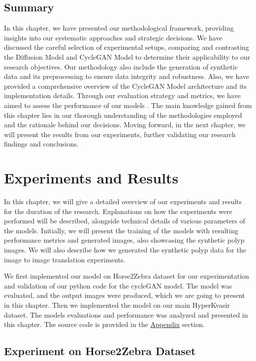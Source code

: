 \documentclass[UKenglish,12pt]{master-style}
\begin{document}
\section{Summary}

In this chapter, we have presented our methodological framework, providing insights into our systematic approaches and strategic decisions. We have discussed the careful selection of experimental setups, comparing and contrasting the Diffusion Model and CycleGAN Model to determine their applicability to our research objectives. Our methodology also include the generation of synthetic data and its preprocessing to ensure data integrity and robustness. Also, we have provided a comprehensive overview of the CycleGAN Model architecture and its implementation details. Through our evaluation strategy and metrics, we have aimed to assess the performance of our models . The main knowledge gained from this chapter lies in our thorough understanding of the methodologies employed and the rationale behind our decisions. Moving forward, in the next chapter, we will present the results from our experiments, further validating our research findings and conclusions. 

\chapter{Experiments and Results}

In this chapter, we will give a detailed overview of our experiments and results for the duration of the research. Explanations on how the experiments were performed will be described, alongside technical details of various parameters of the models. Initially, we will present the training of the models with resulting performance metrics and generated images, also showcasing the synthetic polyp images. We will also describe how we generated the synthetic polyp data for the image to image translation experiments. 

We first implemented our model on Horse2Zebra dataset for our experimentation and validation of our python code for the cycleGAN model. The model was evaluated, and the output images were produced, which we are going to present in this chapter. Then we implemented the model on our main HyperKvasir dataset. The models evaluations and performance was analyzed and presented in this chapter. The source code is provided in the \hyperref[appendix]{Appendix} section. 

\section{Experiment on Horse2Zebra Dataset}
\end{document}
